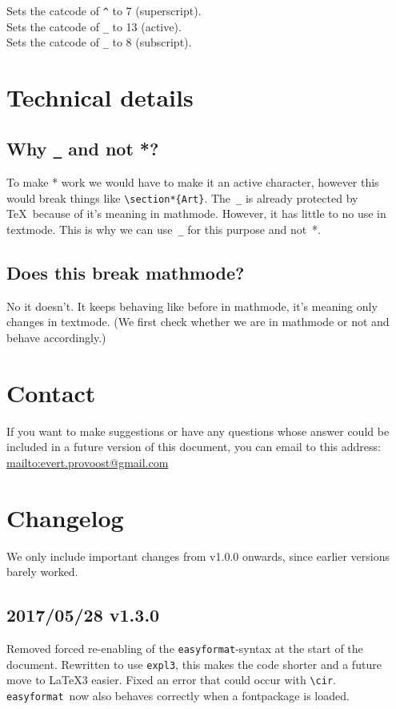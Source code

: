 \documentclass[a4paper, 11pt]{article}
\def\easyformat{\texttt{easyformat}}
\begin{document}
	\noindent{}
	Sets the catcode of \verb|^| to 7 (superscript).\\
	
	\noindent{}
	Sets the catcode of \verb|_| to 13 (active).\\
	
	\noindent{}
	Sets the catcode of \verb|_| to 8 (subscript).
	
	\section{Technical details}
	\subsection{Why \texttt{\_} and not *?\label{Why?!}}
	To make * work we would have to make it an active character, however this would break things like \verb|\section*{Art}|. The~\verb|_| is already protected by \TeX\ because of it's meaning in mathmode. However, it has little to no use in textmode. This is why we can use~\verb|_| for this purpose and not~*.
	
	\subsection{Does this break mathmode?}
	No it doesn't. It keeps behaving like before in mathmode, it's meaning only changes in textmode. (We first check whether we are in mathmode or not and behave accordingly.)

	\section{Contact\label{contact}}
	If you want to make suggestions or have any questions whose answer could be included in a future version of this document, you can email to this address: \url{mailto:evert.provoost@gmail.com}
	\newpage
	
	\section{Changelog}
	We only include important changes from v1.0.0 onwards, since earlier versions barely worked.

	\subsection*{2017/05/28 v1.3.0}
	Removed forced re-enabling of the \easyformat-syntax at the start of the document.
	Rewritten to use \texttt{expl3}, this makes the code shorter and a future move to \LaTeX3 easier.
	Fixed an error that could occur with \verb|\cir|.
	\easyformat\ now also behaves correctly when a fontpackage is loaded.
\end{document}
